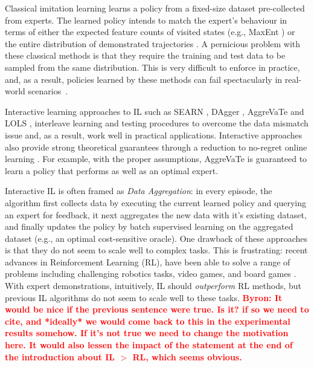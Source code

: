 \documentclass{article}
\newcommand{\BB}[1]{\textcolor{red}{\bf Byron: {#1}}}
\begin{document}
Classical imitation learning \cite{abbeel2004apprenticeship,syed2008apprenticeship,ziebart2008maximum,finn2016guided,ho2016generative} learns a policy from a fixed-size dataset pre-collected from experts. The learned policy intends to match the expert's behaviour in terms of either the expected feature counts of visited states (e.g., MaxEnt \cite{ziebart2008maximum}) or the entire distribution of demonstrated trajectories \cite{ho2016generative}. A pernicious problem with these classical methods is that they require the training and test data to be sampled from the same distribution.  This is very difficult to enforce in practice, and, as a result, policies learned by these methods can fail spectacularly in real-world scenarios~\cite{ross2010efficient}.

Interactive learning approaches to IL such as SEARN \cite{daume2009search}, DAgger \cite{Ross2011_AISTATS}, AggreVaTe \cite{ross2014reinforcement} and LOLS \cite{chang2015learning}, interleave learning and testing procedures to overcome the data mismatch issue and, as a result, work well in practical applications. 
Interactive approaches also provide strong theoretical guarantees through a reduction to no-regret online learning \cite{Zinkevich2003_ICML,shalev2012online}. For example, with the proper assumptions, AggreVaTe \cite{ross2014reinforcement} is guaranteed to learn a policy that performs as well as an optimal expert.%


Interactive IL is often framed as \emph{Data Aggregation}: in every episode, the algorithm first collects data by executing the current learned policy and querying an expert for feedback, it next aggregates the new data with it's existing dataset, and finally updates the policy by batch supervised learning on the aggregated dataset (e.g., an optimal cost-sensitive oracle). One drawback of these approaches is that they do not seem to scale well to complex tasks. This is frustrating: recent advances in Reinforcement Learning (RL), have been able to solve a range of problems including challenging robotics tasks, video games, and board games \cite{schulman2015trust,duan2016benchmarking,silver2016mastering}. With expert demonstrations, intuitively, IL should \emph{outperform} RL methods, but previous IL algorithms do not seem to scale well to these tasks. \BB{It would be nice if the previous sentence were true. Is it? if so we need to cite, and *ideally* we would come back to this in the experimental results somehow. If it's not true we need to change the motivation here. It would also lessen the impact of the statement at the end of the introduction about IL $>$ RL, which seems obvious. }
\end{document}
